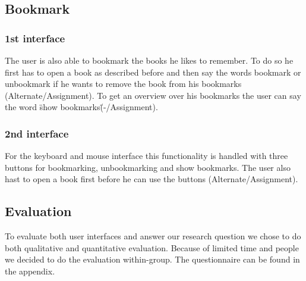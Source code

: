 \documentclass[a4paper, 10pt]{article}
\begin{document}
	\subsection{Bookmark}
	
	\subsubsection{1st interface}
	
	\par{The user is also able to bookmark the books he likes to remember. To do so he first has to open a book as described before and then say the words bookmark or unbookmark if he wants to remove the book from his bookmarks (Alternate/Assignment). To get an overview over his bookmarks the user can say the word \"show bookmarks\" (-/Assignment).}
	
	\subsubsection{2nd interface}
	
	\par{For the keyboard and mouse interface this functionality is handled with three buttons for bookmarking, unbookmarking and show bookmarks. The user also hast to open a book first before he can use the buttons (Alternate/Assignment).}
	
	
	\subsection{Evaluation}
	
	\par{To evaluate both user interfaces and answer our research question we chose to do both qualitative and quantitative evaluation. Because of limited time and people we decided to do the evaluation within-group. The questionnaire can be found in the appendix.}
	
	\newpage
	\appendix
	
	
	
	
	
	
	
	
	
\end{document}
